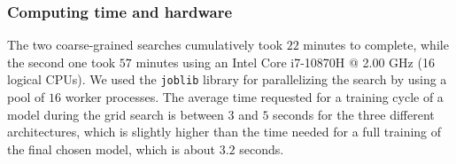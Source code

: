 \begin{table}[htb]
    \centering
    \caption{Hyperparameters and average training, validation and test error of the 8 most performant configurations after last grid search}
    \label{table:grid_search_results}
\end{table}

\subsubsection{Computing time and hardware}
The two coarse-grained searches cumulatively took $22$ minutes to complete, while the second one took $57$ minutes using an Intel Core i7-10870H @ 2.00 GHz (16 logical CPUs). We used the \texttt{joblib} library for parallelizing the search by using a pool of $16$ worker processes. The average time requested for a training cycle of a model during the grid search is between $3$ and $5$ seconds for the three different architectures, which is slightly higher than the time needed for a full training of the final chosen model, which is about $3.2$ seconds.

